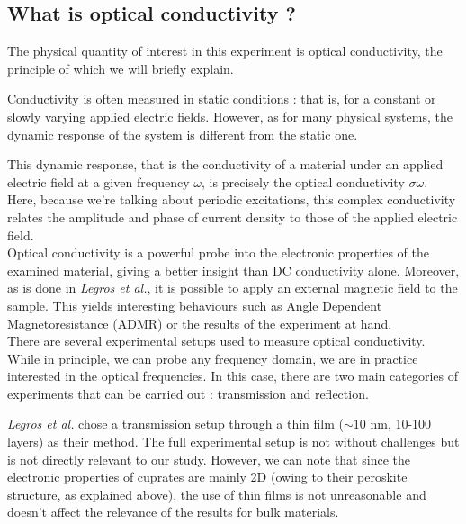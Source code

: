 \subsection{What is optical conductivity ?}
The physical quantity of interest in this experiment is optical conductivity, 
the principle of which we will briefly explain.

Conductivity is often measured in static conditions : 
that is, for a constant or slowly varying applied electric fields. 
However, as for many physical systems, 
the dynamic response of the system is different from the static one. 

This dynamic response, 
that is the conductivity of a material under an applied electric field at a given frequency $\omega$, 
is precisely the optical conductivity $\sigma{\omega}$. 
Here, because we're talking about periodic excitations, this complex conductivity relates the amplitude and phase of current density to those of the applied electric field. \\

Optical conductivity is a powerful probe into the electronic properties of the examined material, 
giving a better insight than DC conductivity alone. 
Moreover, as is done in \textit{Legros et al.}, 
it is possible to apply an external magnetic field to the sample. 
This yields interesting behaviours such as Angle Dependent Magnetoresistance (ADMR) 
or the results of the experiment at hand. \\

There are several experimental setups used to measure optical conductivity. 
While in principle, we can probe any frequency domain, 
we are in practice interested in the optical frequencies. 
In this case, there are two main categories of experiments that can be carried out : 
transmission and reflection. 


\textit{Legros et al.} chose a transmission setup through a thin film ($\sim 10$ nm, 10-100 layers) as their method. 
The full experimental setup is not without challenges but is not directly relevant to our study. 
However, we can note that since the electronic properties of cuprates are mainly 2D 
(owing to their peroskite structure, as explained above), 
the use of thin films is not unreasonable 
and doesn't affect the relevance of the results for bulk materials.